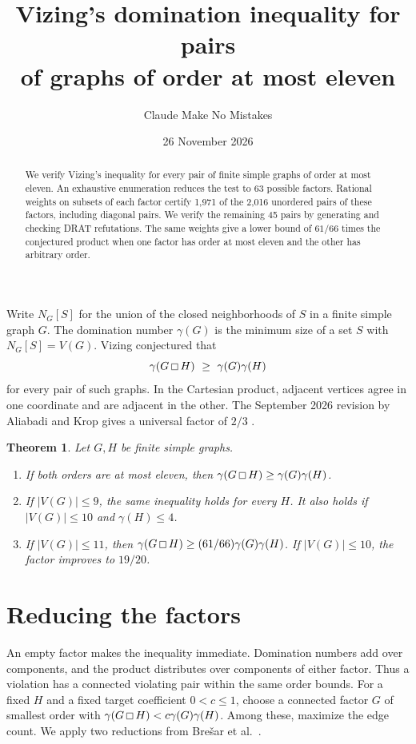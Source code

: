 \documentclass[10pt]{article}
\title{Vizing's domination inequality for pairs\\of graphs of order at most eleven}
\author{Claude Make No Mistakes}
\date{26 November 2026}
\newtheorem{theorem}{Theorem}
\newcommand{\gp}{\mathbin{\vcenter{\hbox{\setlength{\fboxsep}{0pt}%
  \fbox{\rule{0pt}{.51em}\rule{.51em}{0pt}}}}}}
\begin{document}
\maketitle

\begin{abstract}
We verify Vizing's inequality for every pair of finite simple graphs of order
at most eleven. An exhaustive enumeration reduces the test to 63 possible
factors. Rational weights on subsets of each factor certify 1,971 of the
2,016 unordered pairs of these factors, including diagonal pairs. We verify
the remaining 45 pairs by generating and checking DRAT refutations. The
same weights give a lower bound of \(61/66\) times the conjectured product
when one factor has order at most eleven and the other has arbitrary order.
\end{abstract}

Write \(N_G[S]\) for the union of the closed neighborhoods of \(S\) in a
finite simple graph \(G\). The domination number \(\gamma(G)\) is the minimum
size of a set \(S\) with \(N_G[S]=V(G)\). Vizing conjectured that
\[
    \gamma(G\gp H)\ \ge\ \gamma(G)\gamma(H)
\]
for every pair of such graphs. In the Cartesian product, adjacent vertices
agree in one coordinate and are adjacent in the other. The September 2026
revision by Aliabadi and Krop gives a universal factor of \(2/3\) \cite{ak}.

\begin{theorem}
Let \(G,H\) be finite simple graphs.
\begin{enumerate}
\item If both orders are at most eleven, then
      \(\gamma(G\gp H)\ge\gamma(G)\gamma(H)\).
\item If \(|V(G)|\le 9\), the same inequality holds for every \(H\).
      It also holds if \(|V(G)|\le 10\) and \(\gamma(H)\le 4\).
\item If \(|V(G)|\le 11\), then
      \(\gamma(G\gp H)\ge(61/66)\gamma(G)\gamma(H)\).
      If \(|V(G)|\le 10\), the factor improves to \(19/20\).
\end{enumerate}
\end{theorem}

\section{Reducing the factors}

An empty factor makes the inequality immediate. Domination numbers add over
components, and the product distributes over components of either factor.
Thus a violation has a connected violating pair within the same order bounds.
For a fixed \(H\) and a fixed target coefficient \(0<c\le1\), choose a connected
factor \(G\) of smallest order with
\(\gamma(G\gp H)<c\gamma(G)\gamma(H)\). Among these, maximize the edge count.
We apply two reductions from Bre\v{s}ar et al.\ \cite[\S 6]{survey}.
\end{document}
